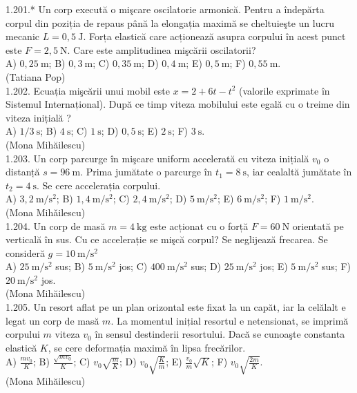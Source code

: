 1.201.* Un corp execută o mişcare oscilatorie armonică. Pentru a îndepărta corpul din poziția de repaus până la elongația maximă se cheltuieşte un lucru mecanic $L=0,5 \mathrm{~J}$. Forța elastică care acționează asupra corpului în acest punct este $F=2,5 \mathrm{~N}$. Care este amplitudinea mişcării oscilatorii?\\ A) $0,25 \mathrm{~m}$; B) $0,3 \mathrm{~m}$; C) $0,35 \mathrm{~m}$; D) $0,4 \mathrm{~m}$; E) $0,5 \mathrm{~m}$; F) $0,55 \mathrm{~m}$.\\ (Tatiana Pop)\\

1.202. Ecuația mişcării unui mobil este $x=2+6 t-t^{2}$ (valorile exprimate în Sistemul Internațional). După ce timp viteza mobilului este egală cu o treime din viteza inițială ?\\ A) $1 / 3 \mathrm{~s}$; B) $4 \mathrm{~s}$; C) $1 \mathrm{~s}$; D) $0,5 \mathrm{~s}$; E) $2 \mathrm{~s}$; F) $3 \mathrm{~s}$.\\ (Mona Mihăilescu)\\

1.203. Un corp parcurge în mişcare uniform accelerată cu viteza inițială $v_{0}$ o distanță $s=96 \mathrm{~m}$. Prima jumătate o parcurge în $t_{1}=8 \mathrm{~s}$, iar cealaltă jumătate în $t_{2}=4 \mathrm{~s}$. Se cere accelerația corpului.\\ A) $3,2 \mathrm{~m} / \mathrm{s}^{2}$; B) $1,4 \mathrm{~m} / \mathrm{s}^{2}$; C) $2,4 \mathrm{~m} / \mathrm{s}^{2}$; D) $5 \mathrm{~m} / \mathrm{s}^{2}$; E) $6 \mathrm{~m} / \mathrm{s}^{2}$; F) $1 \mathrm{~m} / \mathrm{s}^{2}$.\\ (Mona Mihǎilescu)\\

1.204. Un corp de masă $m=4 \mathrm{~kg}$ este acționat cu o forță $F=60 \mathrm{~N}$ orientată pe verticală în sus. Cu ce accelerație se mişcă corpul? Se neglijează frecarea. Se consideră $g=10 \mathrm{~m} / \mathrm{s}^{2}$\\ A) $25 \mathrm{~m} / \mathrm{s}^{2}$ sus; B) $5 \mathrm{~m} / \mathrm{s}^{2}$ jos; C) $400 \mathrm{~m} / \mathrm{s}^{2}$ sus; D) $25 \mathrm{~m} / \mathrm{s}^{2}$ jos; E) $5 \mathrm{~m} / \mathrm{s}^{2}$ sus; F) $20 \mathrm{~m} / \mathrm{s}^{2}$ jos.\\ (Mona Mihăilescu)\\

1.205. Un resort aflat pe un plan orizontal este fixat la un capăt, iar la celălalt e legat un corp de masă $m$. La momentul inițial resortul e netensionat, se imprimă corpului $m$ viteza $v_{0}$ în sensul destinderii resortului. Dacă se cunoaşte constanta elastică $K$, se cere deformația maximă în lipsa frecărilor.\\ A) $\frac{m v_{0}}{K}$; B) $\frac{\sqrt{m v_{0}}}{K}$; C) $v_{0} \sqrt{\frac{m}{K}}$; D) $v_{0} \sqrt{\frac{K}{m}}$; E) $\frac{v_{0}}{m} \sqrt{K}$; F) $v_{0} \sqrt{\frac{2 m}{K}}$.\\ (Mona Mihăilescu)\\

